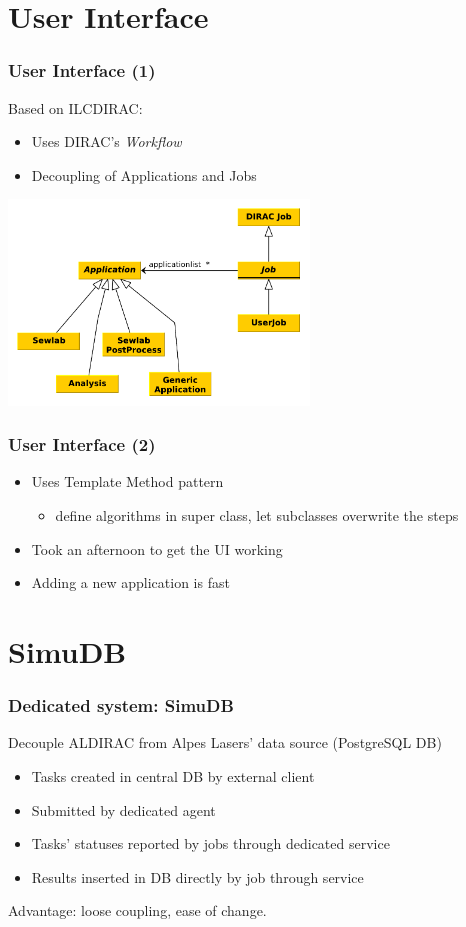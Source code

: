 \documentclass[14pt]{beamer}
\begin{document}
\section{User Interface}
\begin{frame}
\frametitle{User Interface (1)}
Based on ILCDIRAC:
\begin{itemize}
\setlength{\itemindent}{-1.2em}
\item Uses DIRAC's \emph{Workflow}
\item Decoupling of Applications and Jobs
\end{itemize}
\centering
\includegraphics[width=8cm]{UI_UML}
\end{frame}
\begin{frame}
\frametitle{User Interface (2)}
\begin{itemize}
\setlength{\itemindent}{-1.2em}
\item Uses \alert{Template Method} pattern
\begin{itemize}
\item define algorithms in super class, let subclasses overwrite the steps
\end{itemize}
\item Took an afternoon to get the UI working
\item Adding a new application is fast
\end{itemize}
\end{frame}

\section{SimuDB}
\begin{frame}
\frametitle{Dedicated system: SimuDB}
{\color{blue}Decouple ALDIRAC from Alpes Lasers' data source} (PostgreSQL DB)
\begin{itemize}
\setlength{\itemindent}{-1.2em}
\item Tasks created in central DB by {\color{blue}external client}
\item Submitted by \alert{dedicated agent} 
\item Tasks' statuses reported by jobs through \alert{dedicated service}
\item \alert{Results inserted in DB directly} by job through service
\end{itemize}
Advantage: loose coupling, ease of change.
\end{frame}
\end{document}

